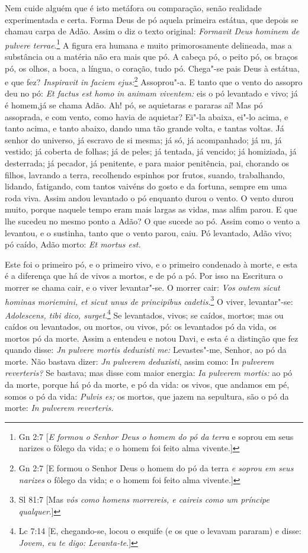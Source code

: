 Nem cuide alguém que é isto metáfora ou comparação, senão realidade
experimentada e certa. Forma Deus de pó aquela primeira estátua, que
depois se chamau carpa de Adão. Assim o diz o texto original:
\emph{Formavit Deus hominem de pulvere terrae}.\footnote{Gn 2:7 [\emph{E formou o Senhor Deus o homem do pó da terra} e soprou em seus narizes o fôlego da
vida; e o homem foi feito alma vivente.]} A figura era
humana e muito primorosamente delineada, mas a substância ou a matéria
não era mais que pó. A cabeça pó, o peito pó, os braços pó, os olhos, a
boca, a língua, o coração, tudo pó. Chega"-se pais Deus à estátua, e que
fez? \emph{Inspiravit in faciem ejus:}\footnote{Gn 2:7 [E formou o Senhor Deus o homem do pó da terra \emph{e soprou em seus narizes} o fôlego da vida; e o homem foi feito alma vivente.]} Assoprou"-a. E tanto
que o vento do assopro deu no pó: \emph{Et factus est homo in animam
viventem:} eis o pó levantado e vivo; já é homem,já se chama Adão. Ah!
pó, se aquietaras e pararas aí! Mas pó assoprada, e com vento, como
havia de aquietar? Ei"-la abaixa, ei"-lo acima, e tanto acima, e tanto
abaixo, dando uma tão grande volta, e tantas voltas. Já senhor do
universo, já escravo de si mesma; já só, já acompanhado; já nu, já
vestido; já coberta de folhas; já de peles; já tentada, já vencido; já
homiziada, já desterrada; já pecador, já penitente, e para maior
penitência, pai, chorando os filhos, lavrando a terra, recolhendo
espinhos por frutos, suando, trabalhando, lidando, fatigando, com tantos
vaivéns do gosto e da fortuna, sempre em uma roda viva. Assim andou
levantado o pó enquanto durou o vento. O vento durou muito, porque
naquele tempo eram mais largas as vidas, mas alfim parou. E que lhe
sucedeu no mesmo ponto a Adão? O que sucede ao pó. Assim como o vento a
levantou, e o sustinha, tanto que o vento parou, caiu. Pó levantado,
Adão vivo; pó caído, Adão morto: \emph{Et mortus est.}

Este foi o primeiro pó, e o primeiro vivo, e o primeiro condenado
à morte, e esta é a diferença que há de vivos a mortos, e de pó a pó.
Por isso na Escritura o morrer se chama cair, e o viver levantar"-se. O
morrer cair: \emph{Vos outem sicut hominas moriemini, et sicut unus de
principibus cadetis}.\footnote{Sl 81:7 [Mas \emph{vós como homens morrereis, e caireis como um príncipe qualquer}.]} O viver, levantar"-se: \emph{Adolescens, tibi
dico, surget}.\footnote{Lc 7:14 [E, chegando-se, locou o esquife (e os que o levavam pararam) e disse: \emph{Jovem, eu te digo: Levanta-te}.]} Se levantados, vivos; se caídos, mortos; mas ou caídos
ou levantados, ou mortos, ou vivos, pó: os levantados pó da vida, os
mortos pó da morte. Assim a entendeu e notou Davi, e esta é a distinção
que fez quando disse: \emph{Jn pulvere mortis deduxisti me:}
Levastes"-me, Senhor, ao pó da morte. Não bastava dizer: \emph{Jn
pulverem deduxisti}, assim como: I\emph{n pulverem reverteris?} Se
bastava; mas disse com maior energia: \emph{Ia pulverem mortis:} ao pó
da morte, porque há pó da morte, e pó da vida: os vivos, que andamos em
pé, somos o pó da vida: \emph{Pulvis es;} os mortos, que jazem na
sepultura, são o pó da morte: \emph{In pulverem reverteris.}

